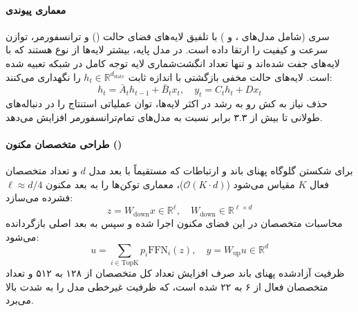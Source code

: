 \item {}

\paragraph*{معماری پیوندی }
سری  \cite{nemotron3_2025} (شامل مدل‌های ،  و ) با تلفیق لایه‌های فضای حالت () و ترانسفورمر، توازن سرعت و کیفیت را ارتقا داده است. در مدل پایه، بیشتر لایه‌ها از نوع  هستند که با لایه‌های  جفت شده‌اند و تنها تعداد انگشت‌شماری لایه توجه کامل در شبکه تعبیه شده است. لایه‌های  حالت مخفی بازگشتی با اندازه ثابت $h_t \in \mathbb{R}^{d_{\text{state}}}$ را نگهداری می‌کنند:
\begin{equation}
    h_t = \bar{A}_t h_{t-1} + \bar{B}_t x_t, \quad y_t = C_t h_t + D x_t
\end{equation}
حذف نیاز به کش رو به رشد  در اکثر لایه‌ها، توان عملیاتی استنتاج را در دنباله‌های طولانی تا بیش از ۳.۳ برابر نسبت به مدل‌های تمام‌ترانسفورمر افزایش می‌دهد.

\paragraph*{طراحی متخصصان مکنون ()}
برای شکستن گلوگاه پهنای باند و ارتباطات  که مستقیماً با بعد مدل $d$ و تعداد متخصصان فعال $K$ مقیاس می‌شود ($\mathcal{O}(K \cdot d)$)، معماری  توکن‌ها را به بعد مکنون $\ell \approx d/4$ فشرده می‌سازد:
\begin{equation}
    z = W_{\text{down}} x \in \mathbb{R}^\ell, \quad W_{\text{down}} \in \mathbb{R}^{\ell \times d}
\end{equation}
محاسبات متخصصان در این فضای مکنون اجرا شده و سپس به بعد اصلی بازگردانده می‌شود:
\begin{equation}
    u = \sum_{i \in \text{TopK}} p_i \text{FFN}_i(z), \quad y = W_{\text{up}} u \in \mathbb{R}^d
\end{equation}
ظرفیت آزادشده پهنای باند صرف افزایش تعداد کل متخصصان از ۱۲۸ به ۵۱۲ و تعداد متخصصان فعال از ۶ به ۲۲ شده است، که ظرفیت غیرخطی مدل را به شدت بالا می‌برد.

